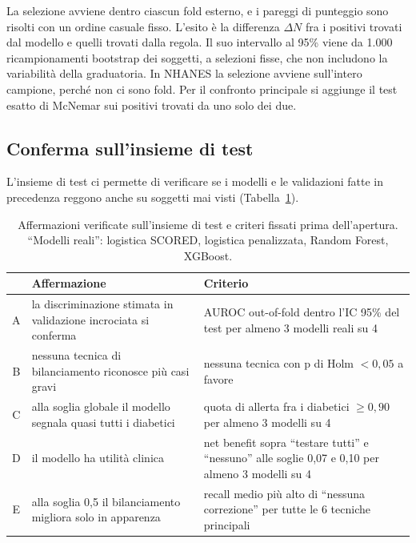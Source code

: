 \documentclass[a4paper, 12pt, oneside]{book}
\begin{document}
La selezione avviene dentro ciascun fold esterno, e i pareggi di punteggio sono risolti con un ordine casuale fisso. L'esito è la differenza $\Delta N$ fra i positivi trovati dal modello e quelli trovati dalla regola. Il suo intervallo al 95\% viene da 1.000 ricampionamenti bootstrap dei soggetti, a selezioni fisse, che non includono la variabilità della graduatoria. In NHANES la selezione avviene sull'intero campione, perché non ci sono fold. Per il confronto principale si aggiunge il test esatto di McNemar sui positivi trovati da uno solo dei due.

\subsection{Conferma sull'insieme di test}

L'insieme di test ci permette di verificare se i modelli e le validazioni fatte in precedenza reggono anche su soggetti mai visti (Tabella~\ref{tab:affermazioni}).

\begin{table}[H]
	\centering
	\small
	\caption{Affermazioni verificate sull'insieme di test e criteri fissati prima dell'apertura. \enquote{Modelli reali}: logistica SCORED, logistica penalizzata, Random Forest, XGBoost.}
	\label{tab:affermazioni}
	\begin{tabularx}{\textwidth}{@{}c >{\raggedright\arraybackslash}X >{\raggedright\arraybackslash}p{5cm}@{}}
		\toprule
		& Affermazione & Criterio \\
		\midrule
		A & la discriminazione stimata in validazione incrociata si conferma & AUROC out-of-fold dentro l'IC 95\% del test per almeno 3 modelli reali su 4 \\
		B & nessuna tecnica di bilanciamento riconosce più casi gravi & nessuna tecnica con p di Holm $< 0{,}05$ a favore \\
		C & alla soglia globale il modello segnala quasi tutti i diabetici & quota di allerta fra i diabetici $\geq 0{,}90$ per almeno 3 modelli su 4 \\
		D & il modello ha utilità clinica & net benefit sopra \enquote{testare tutti} e \enquote{nessuno} alle soglie 0,07 e 0,10 per almeno 3 modelli su 4 \\
		E & alla soglia 0,5 il bilanciamento migliora solo in apparenza & recall medio più alto di \enquote{nessuna correzione} per tutte le 6 tecniche principali \\
		\bottomrule
	\end{tabularx}
\end{table}
\end{document}
